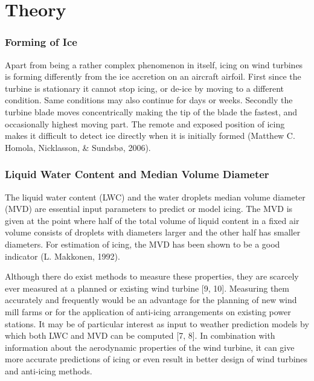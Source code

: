
\chapter{Theory}
\label{chap:theory}

\subsection{Forming of Ice}

Apart from being a rather complex phenomenon in itself, icing on wind turbines is forming differently from the ice accretion on an aircraft airfoil. First since the turbine is stationary it cannot stop icing, or de-ice by moving to a different condition. Same conditions may also continue for days or weeks. Secondly the turbine blade moves concentrically making the tip of the blade the fastest, and occasionally highest moving part. The remote and exposed position of icing makes it difficult to detect ice directly when it is initially formed (Matthew C. Homola, Nicklasson, \& Sundsbø, 2006).

\subsection{Liquid Water Content and Median Volume Diameter}

The liquid water content (LWC) and the water droplets median volume diameter (MVD) are essential input parameters to predict or model icing. The  MVD is given at the point where half of the total volume of liquid content in a fixed air volume consists of droplets with diameters larger and the other half has smaller diameters. For estimation of icing, the MVD has been shown to be a good indicator (L. Makkonen, 1992).

Although there do exist methods to measure these properties, they are scarcely ever measured at a planned or existing wind turbine [9, 10]. Measuring them accurately and frequently would be an advantage for the planning of new wind mill farms or for the application of anti-icing arrangements on existing power stations. It may be of particular interest as input to weather prediction models by which both LWC and MVD can be computed [7, 8]. In combination with information about the aerodynamic properties of the wind turbine, it can give more accurate predictions of icing or even result in better design of wind turbines and anti-icing methods.

